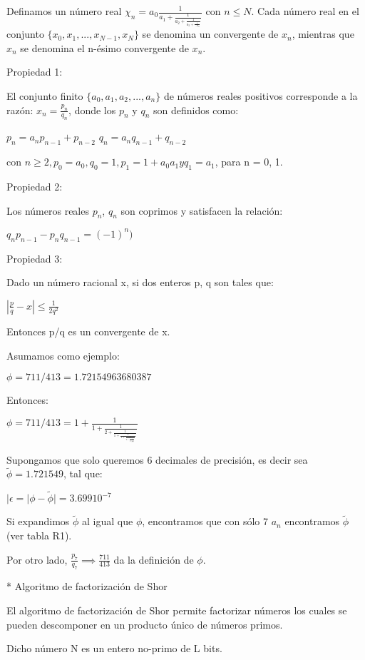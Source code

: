 Definamos un número real $\chi_n = a_0 \frac{1}{a_1 + \frac{1}{a_2 + \frac{1}{a_3 + \frac{1}{... a_n}}}}$ con $n \leq N$. Cada número real en el conjunto $\{x_0,x_1,...,x_{N-1},x_N\}$ se denomina un convergente de $x_n$, mientras que $x_n$ se denomina el n-ésimo convergente de $x_n$.

Propiedad 1:

El conjunto finito $\{a_0,a_1,a_2,...,a_n\}$ de números reales positivos corresponde a la razón: $x_n = \frac{p_n}{q_n}$, donde los $p_n$ y $q_n$ son definidos como:

$p_n = a_n p_{n-1} + p_{n-2}$
$q_n = a_n q_{n-1} + q_{n-2}$

con $n \geq 2, p_0 = a_0, q_0 = 1, p_1 = 1 + a_0 a_1 y q_1 = a_1$, para n = 0, 1.

Propiedad 2:

Los números reales $p_n$, $q_n$ son coprimos y satisfacen la relación:

$q_n p_{n-1} - p_n q_{n-1} = (-1)^n)$

Propiedad 3:

Dado un número racional x, si dos enteros p, q son tales que:

$|\frac{p}{q} - x| \leq \frac{1}{2q^2}$

Entonces p/q es un convergente de x.

Asumamos como ejemplo:

$\phi = 711/413 = 1.72154963680387$

Entonces:

$\phi = 711/413 = 1 + \frac{1}{1 + \frac{1}{2 + \frac{1}{1 + \frac{1}{1 + \frac{1}{2 + \frac{1}{4 + \frac{1}{5}}}}}}}$

Supongamos que solo queremos 6 decimales de precisión, es decir sea $\tilde{\phi} = 1.721549$, tal que:

$|\epsilon = |\phi - \tilde{\phi}| = 3.699 10^{-7}$

Si expandimos $\tilde{\phi}$ al igual que $\phi$, encontramos que con sólo 7 $a_n$ encontramos $\tilde{\phi}$ (ver tabla R1).

Por otro lado, $\frac{p_7}{q_7} \implies \frac{711}{413}$ da la definición de $\phi$.

* Algoritmo de factorización de Shor

El algoritmo de factorización de Shor permite factorizar números los cuales se pueden descomponer en un producto único de números primos.

Dicho número N es un entero no-primo de L bits.

